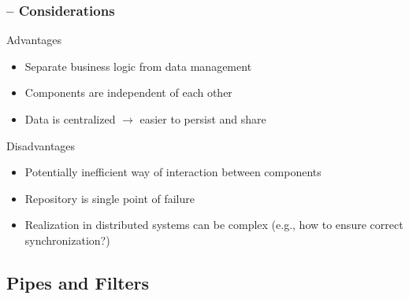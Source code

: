 \begin{frame}
    \frametitle{\insertsubsection{} -- Considerations}
    \begin{fancycolumns}[widths={45,55}]
        \begin{motivation}{Advantages}
            \begin{itemize}
                \item Separate business logic from data management
                \item Components are independent of each other
                \item Data is centralized $\rightarrow$ easier to persist and share
            \end{itemize}
        \end{motivation}
        \begin{note}{Disadvantages}
            \begin{itemize}
                \item Potentially inefficient way of interaction between components
                \item Repository is single point of failure
                \item Realization in distributed systems can be complex (e.g., how to ensure correct synchronization?)
            \end{itemize}
        \end{note}
        \nextcolumn
        \repositorydefault{}
    \end{fancycolumns}
\end{frame}



\subsection{Pipes and Filters} %


